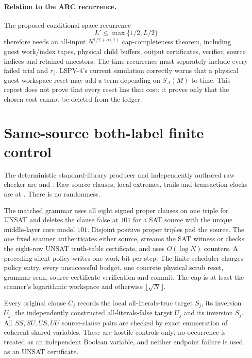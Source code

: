 \documentclass[11pt]{article}
\begin{document}
\paragraph{Relation to the ARC recurrence.}
The proposed conditional space recurrence
\[
 L'\le\max\{1/2,L/2\}
\]
therefore needs an all-input $N^{1/2+o(1)}$ cap-completeness theorem, including
guest work/index tapes, physical child buffers, output certificates, verifier,
source indices and retained ancestors.  The time recurrence must separately
include every failed trial and $r_i$.  LSPV-4's current simulation correctly
warns that a physical guest-workspace reset may add a term depending on
$S_A(M)$ to time.  This report does not prove that every reset has that cost;
it proves only that the chosen cost cannot be deleted from the ledger.

\section{Same-source both-label finite control}
The deterministic standard-library producer and independently authored raw
checker are
 and
.
Raw source clauses, local extremes, trails and transaction clocks are at
.
There is no randomness.

The matched grammar uses all eight signed proper clauses on one triple for
UNSAT and deletes the clause false at $101$ for a SAT source with the unique
middle-layer core model $101$.  Disjoint positive proper triples pad the
source.  The one fixed scanner authenticates either source, streams the SAT
witness or checks the eight-row UNSAT truth-table certificate, and uses
$O(\log N)$ counters.  A preceding silent policy writes one work bit per step.
The finite scheduler charges policy entry, every unsuccessful budget, one
concrete physical scrub reset, grammar scan, source certificate verification
and commit.  The cap is at least the scanner's logarithmic workspace and
otherwise $\lfloor\sqrt N\rfloor$.

Every original clause $C_j$ records the local all-literals-true target $S_j$,
its inversion $U_j$, the independently constructed all-literals-false target
$U_j$ and its inversion $S_j$.  All $SS,SU,US,UU$ source-clause pairs are
checked by exact enumeration of coherent shared variables.  These are hostile
controls only; no occurrence is treated as an independent Boolean variable,
and neither endpoint failure is used as an UNSAT certificate.
\end{document}
